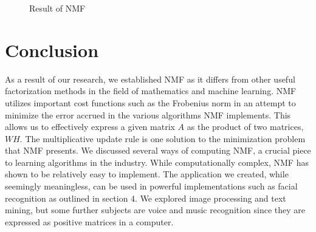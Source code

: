 \documentclass[
10pt, %
a4paper, %
oneside, %
headinclude,footinclude, %
BCOR5mm, %
]{scrartcl}
\begin{document}
\begin{figure}[tb]
    \centering
    \caption{Result of NMF}
    \label{fig:application}
\end{figure}
\newpage
\section{Conclusion}
As a result of our research, we established NMF as it differs from other useful factorization methods in the field of mathematics and machine learning. NMF utilizes important cost functions such as the Frobenius norm in an attempt to minimize the error accrued in the various algorithms NMF implements. This allows us to effectively express a given matrix $A$ as the product of two matrices, $WH$. The multiplicative update rule is one solution to the minimization problem that NMF presents. We discussed several ways of computing NMF, a crucial piece to learning algorithms in the industry. While computationally complex, NMF has shown to be relatively easy to implement. The application we created, while seemingly meaningless, can be used in powerful implementations such as facial recognition as outlined in section 4. We explored image processing and text mining, but some further subjects are voice and music recognition since they are expressed as positive matrices in a computer.
\renewcommand{\refname}{\spacedlowsmallcaps{References}} %

\end{document}
